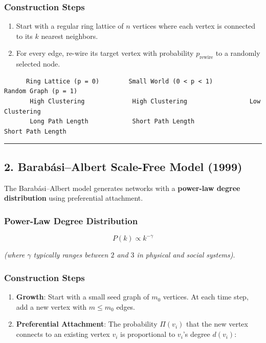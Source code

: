 \documentclass[
]{book}
\providecommand{\tightlist}{%
  \setlength{\itemsep}{0pt}\setlength{\parskip}{0pt}}
\theoremstyle{definition}
\theoremstyle{definition}
\theoremstyle{definition}
\theoremstyle{definition}
\theoremstyle{remark}
\begin{document}
\subsubsection{Construction Steps}\label{construction-steps}

\begin{enumerate}
\def\labelenumi{\arabic{enumi}.}
\tightlist
\item
  Start with a regular ring lattice of \(n\) vertices where each vertex is connected to its \(k\) nearest neighbors.
\item
  For every edge, re-wire its target vertex with probability \(p_{\text{rewire}}\) to a randomly selected node.
\end{enumerate}

\begin{verbatim}
      Ring Lattice (p = 0)        Small World (0 < p < 1)         Random Graph (p = 1)
       High Clustering             High Clustering                 Low Clustering
       Long Path Length            Short Path Length               Short Path Length
\end{verbatim}

\begin{center}\rule{0.5\linewidth}{0.5pt}\end{center}

\subsection{2. Barabási--Albert Scale-Free Model (1999)}\label{barabuxe1sialbert-scale-free-model-1999}

The Barabási--Albert model generates networks with a \textbf{power-law degree distribution} using preferential attachment.

\subsubsection{Power-Law Degree Distribution}\label{power-law-degree-distribution}

\[P(k) \propto k^{-\gamma}\]

\emph{(where \(\gamma\) typically ranges between \(2\) and \(3\) in physical and social systems)}.

\subsubsection{Construction Steps}\label{construction-steps-1}

\begin{enumerate}
\def\labelenumi{\arabic{enumi}.}
\tightlist
\item
  \textbf{Growth}: Start with a small seed graph of \(m_0\) vertices. At each time step, add a new vertex with \(m \le m_0\) edges.
\item
  \textbf{Preferential Attachment}: The probability \(\Pi(v_i)\) that the new vertex connects to an existing vertex \(v_i\) is proportional to \(v_i\)'s degree \(d(v_i)\):
\end{enumerate}
\end{document}
